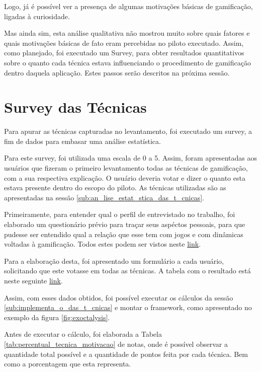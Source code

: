 Logo, já é possível ver a presença de algumas motivações básicas de gamificação, ligadas
à curiosidade.

Mas ainda sim, esta análise qualitativa não mostrou muito sobre quais fatores
e quais motivações básicas de fato eram percebidas no piloto executado. Assim,
como planejado, foi executado um Survey, para obter resultados quantitativos sobre
o quanto cada técnica estava influenciando o procedimento de gamificação dentro
daquela aplicação. Estes passos serão descritos na próxima sessão.

\section{Survey das Técnicas}
\label{sec:gamifição}
Para apurar as técnicas capturadas no levantamento, foi executado um survey, a fim de dados para
embasar uma análise estatística.

Para este survey, foi utilizada uma escala de 0 a 5. Assim, foram apresentadas aos usuários
que fizeram o primeiro levantamento todas as técnicas de gamificação, com a sua
respectiva explicação. O usuário deveria votar e dizer o quanto esta estava presente
dentro do escopo do piloto. As técnicas utilizadas são as apresentadas na sessão
\ref{sub:an_lise_estat_stica_das_t_cnicas}.

Primeiramente, para entender qual o perfil de entrevistado no trabalho, foi elaborado
um questionário prévio para traçar seus aspéctos pessoais,
para que pudesse ser entendido qual a relação que esse tem com jogos e com dinâmicas
voltadas à gamificação. Todos estes podem ser vistos neste \href{https://docs.google.com/spreadsheets/d/1galTU00NPQKaU7GRsYOciLhD0ZzIKH9BbJWyRdC3gbs/edit?usp=sharing}{link}.


Para a elaboração desta, foi apresentado um formulário a cada usuário, solicitando
que este votasse em todas as técnicas. A tabela com o resultado está neste seguinte
\href{https://docs.google.com/spreadsheets/d/1qROpsDaz32PZtkvCvmFTrqLVLgqhHR9F-Q5rcQ_pwys/edit?usp=sharing}{link}.

Assim, com esses dados obtidos, foi possível executar os cálculos da sessão \ref{sub:implementa_o_das_t_cnicas}
e montar o framework, como apresentado no exemplo da figura \ref{fig:exoctalysis}.

Antes de executar o cálculo, foi elaborada a Tabela \ref{tab:percentual_tecnica_motivacao}
 de notas, onde é possível
observar a quantidade total possível e a quantidade de pontos feita por cada técnica.
Bem como a porcentagem que esta representa.


